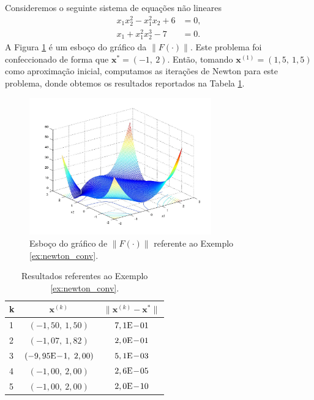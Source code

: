 \begin{ex}\label{ex:newton_conv}
  Consideremos o seguinte sistema de equações não lineares
  \begin{align}
    x_1x_2^2 - x_1^2x_2 + 6 &= 0,\\
    x_1 + x_1^2x_2^3 - 7 &= 0.
  \end{align}
  A Figura \ref{fig:ex_newton_conv} é um esboço do gráfico da $\|F(\cdot)\|$. Este problema foi confeccionado de forma que $\pmb{x}^* = (-1,~2)$. Então, tomando $\pmb{x}^{(1)} = (1,5,~1,5)$ como aproximação inicial, computamos as iterações de Newton para este problema, donde obtemos os resultados reportados na Tabela \ref{tab:ex_newton_conv}. 

  \begin{figure}[h!]
    \centering
    \includegraphics[width=0.7\textwidth]{./cap_snl/dados/ex_newton_conv/ex_newton_conv}
    \caption{Esboço do gráfico de $\|F(\cdot)\|$ referente ao Exemplo \ref{ex:newton_conv}.}
    \label{fig:ex_newton_conv}
  \end{figure}

  \begin{table}[h!]
    \centering
    \begin{tabular}{lcc}
      k & $\pmb{x}^{(k)}$ & $\|\pmb{x}^{(k)} - \pmb{x}^*\|$\\\hline
      1 & $(-1,50,~1,50)$ & $7,1\mathrm{E}\!-\!01$\\
      2 & $(-1,07,~1,82)$ & $2,0\mathrm{E}\!-\!01$\\
      3 & $(-9,95\mathrm{E}\!-\!1,~2,00)$ & $5,1\mathrm{E}\!-\!03$\\
      4 & $(-1,00,~2,00)$ & $2,6\mathrm{E}\!-\!05$ \\
      5 & $(-1,00,~2,00)$ & $2,0\mathrm{E}\!-\!10$ \\\hline
    \end{tabular}
    \caption{Resultados referentes ao Exemplo \ref{ex:newton_conv}.}
    \label{tab:ex_newton_conv}
  \end{table}

% 
\end{ex}

